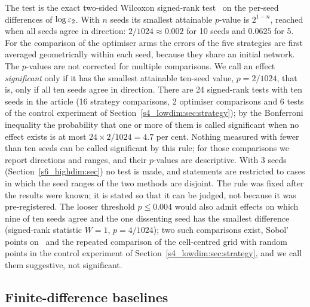 The test is the exact two-sided Wilcoxon signed-rank test~\citep{wilcoxon1945} on the
per-seed differences of $\log\varepsilon_{2}$. With $n$ seeds its smallest attainable $p$-value is
$2^{1-n}$, reached when all seeds agree in direction: $2/1024\approx0.002$ for 10 seeds and
$0.0625$ for 5.
For the comparison of the optimiser arms the errors of the five strategies are first
averaged geometrically within each seed, because they share an initial network. The
$p$-values are not corrected for multiple comparisons. We call an effect
\emph{significant} only if it has the smallest attainable ten-seed value, $p=2/1024$, that is,
only if all ten seeds agree in direction.
There are 24 signed-rank tests with ten seeds in the article (16 strategy comparisons,
2 optimiser comparisons and 6 tests of the control experiment of
Section~\ref{s4_lowdim:sec:strategy}); by the Bonferroni inequality the probability that one
or more of them is called significant when no effect exists is at most
$24\times2/1024=4.7$ per cent. Nothing measured with fewer than ten seeds can be called
significant by this rule; for those comparisons we report directions and ranges, and their
$p$-values are descriptive. With 3 seeds (Section~\ref{s6_highdim:sec}) no test is made, and
statements are restricted to cases in which the seed ranges of the two methods are disjoint.
The rule was fixed after the results were known; it is stated so that it can be judged, not
because it was pre-registered. The looser threshold $p\le0.004$ would also admit effects on
which nine of ten seeds agree and the one dissenting seed has the smallest difference (signed-rank
statistic $W=1$, $p=4/1024$); two such comparisons exist, Sobol' points on \PLtwo\ and the
repeated comparison of the cell-centred grid with random points in the control experiment of
Section~\ref{s4_lowdim:sec:strategy}, and we call them suggestive, not significant.

\subsection{Finite-difference baselines}\label{s3_methods:sec:fd}

